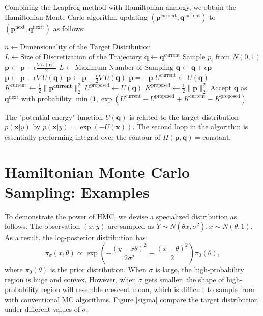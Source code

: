 \documentclass[twoside]{article}
\begin{document}
Combining the Leapfrog method with Hamiltonian analogy, we obtain the Hamiltonian Monte Carlo algorithm updating $(\mathbf{p}^{\text{current}},\mathbf{q}^{\text{current}})$ to $(\mathbf{p}^{\text{next}},\mathbf{q}^{\text{nextt}})$ as follows:
\begin{algorithmic}
\State $n\gets\text{Dimensionality of the Target Distribution}$
\State $L\gets\text{Size of Discretization of the Trajectory}$
\State $\mathbf{q}\gets\mathbf{q}^{\text{current}}$
\State Sample $p_i$ from $N(0, 1)$
\EndFor
\State $\mathbf{p} \gets \mathbf{p}-\epsilon\frac{\nabla U(\mathbf{q})}{2}$
\State $L\gets\text{Maximum Number of Sampling}$
\State $\mathbf{q}\gets\mathbf{q}+\epsilon\mathbf{p}$
\State $\mathbf{p}\gets\mathbf{p}-\epsilon\nabla U(\mathbf{q})$
\EndIf
\EndFor
\State $\mathbf{p} \gets \mathbf{p}-\frac{\epsilon}{2}\nabla U(\mathbf{q})$
\State $\mathbf{p}=-\mathbf{p}$
\State $U^{\text{current}}\gets U(\mathbf{q})$
\State $K^{\text{current}}\gets\frac{1}{2}\|\mathbf{p^{\text{current}}}\|^2_2$
\State $U^{\text{proposed}}\gets U(\mathbf{q})$
\State $K^{\text{proposed}}\gets\frac{1}{2}\|\mathbf{p}\|^2_2$
\State Accept $\mathbf{q}$ as $\mathbf{q}^{\text{next}}$ with probability $\min(1,\exp(U^{\text{current}}-U^{\text{proposed}}+K^{\text{current}}-K^{\text{proposed}})$
\end{algorithmic}
The "potential energy" function $U(\mathbf{q})$ is related to the target distribution $p(\mathbf{x}|y)$ by $p(\mathbf{x}|y)=\exp(-U(\mathbf{x}))$. The second loop in the algorithm is essentially performing integral over the contour of $H(\mathbf{p},\mathbf{q})=\text{constant}$.

\section{Hamiltonian Monte Carlo Sampling: Examples}
To demonstrate the power of HMC, we devise a specialized distribution as follows. The observation $(x,y)$ are sampled as $Y\sim N(\theta x,\sigma^2),x\sim N(\theta,1)$. As a result, the log-posterior distribution has
\begin{equation}
\pi_{\sigma}(x,\theta)\propto\exp\left(-\frac{(y-x\theta)^2}{2\sigma^2}-\frac{(x-\theta)^2}{2}\right)\pi_0(\theta),
\end{equation}
where $\pi_0(\theta)$ is the prior distribution. When $\sigma$ is large, the high-probability region is huge and convex. However, when $\sigma$ gets smaller, the shape of high-probability region will resemble crescent moon, which is difficult to sample from with conventional MC algorithms. Figure \ref{sigma} compare the target distribution under different values of $\sigma$.
\end{document}
